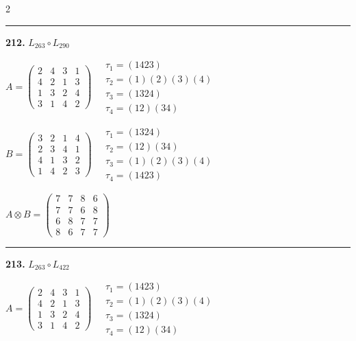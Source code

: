 \begin{multicols}{2}
\vspace{0.3em}
\hrule
\vspace{0.3em}

\noindent\textbf{212.} $L_{263} \circ L_{290}$

$A = \begin{pmatrix} 2 & 4 & 3 & 1 \\ 4 & 2 & 1 & 3 \\ 1 & 3 & 2 & 4 \\ 3 & 1 & 4 & 2 \end{pmatrix} \quad \begin{matrix} \tau_{1}=(1 4 2 3) \\ \tau_{2}=(1)(2)(3)(4) \\ \tau_{3}=(1 3 2 4) \\ \tau_{4}=(1 2)(3 4) \end{matrix}$

$B = \begin{pmatrix} 3 & 2 & 1 & 4 \\ 2 & 3 & 4 & 1 \\ 4 & 1 & 3 & 2 \\ 1 & 4 & 2 & 3 \end{pmatrix} \quad \begin{matrix} \tau_{1}=(1 3 2 4) \\ \tau_{2}=(1 2)(3 4) \\ \tau_{3}=(1)(2)(3)(4) \\ \tau_{4}=(1 4 2 3) \end{matrix}$

$A \otimes B = \begin{pmatrix} 7 & 7 & 8 & 6 \\ 7 & 7 & 6 & 8 \\ 6 & 8 & 7 & 7 \\ 8 & 6 & 7 & 7 \end{pmatrix}$

\vspace{0.3em}
\hrule
\vspace{0.3em}

\noindent\textbf{213.} $L_{263} \circ L_{422}$

$A = \begin{pmatrix} 2 & 4 & 3 & 1 \\ 4 & 2 & 1 & 3 \\ 1 & 3 & 2 & 4 \\ 3 & 1 & 4 & 2 \end{pmatrix} \quad \begin{matrix} \tau_{1}=(1 4 2 3) \\ \tau_{2}=(1)(2)(3)(4) \\ \tau_{3}=(1 3 2 4) \\ \tau_{4}=(1 2)(3 4) \end{matrix}$


\end{multicols}
